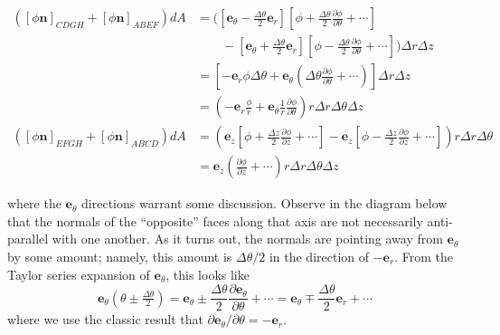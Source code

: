 \documentclass[a4paper]{article}
\begin{document}
\begin{align*}
	\!\left( \!\left[ \phi \pmb{n} \right]_{CDGH} + \!\left[ \phi \pmb{n} \right]_{ABEF} \right)dA & = \biggl( \!\left[ \pmb{e}_{\theta} - \frac{\Delta \theta}{2}\pmb{e}_{r} \right]\!\left[ \phi + \frac{\Delta \theta}{2}\frac{\partial \phi}{\partial \theta} + \cdots \right] \\
												       & \qquad - \!\left[ \pmb{e}_{\theta} + \frac{\Delta \theta}{2}\pmb{e}_{r} \right]\!\left[ \phi - \frac{\Delta \theta}{2}\frac{\partial \phi}{\partial \theta} + \cdots \right] \biggr)\Delta r \Delta z \\
												       & = \!\left[ -\pmb{e}_{r} \phi \Delta \theta + \pmb{e}_{\theta}\!\left( \Delta \theta \frac{\partial \phi}{\partial \theta} + \cdots \right) \right] \Delta r \Delta z \\ 
												       & = \!\left( -\pmb{e}_{r}\frac{\phi}{r} + \pmb{e}_{\theta}\frac{1}{r}\frac{\partial \phi}{\partial \theta} \right) r \Delta r \Delta \theta \Delta z \\
	\!\left( \!\left[ \phi \pmb{n} \right]_{EFGH} + \!\left[ \phi \pmb{n} \right]_{ABCD} \right)dA & = \!\left( \pmb{e}_{z}\!\left[ \phi + \frac{\Delta z}{2}\frac{\partial \phi}{\partial z} + \cdots \right] - \pmb{e}_{z}\!\left[ \phi - \frac{\Delta z}{2}\frac{\partial \phi}{\partial z} + \cdots \right] \right) r \Delta r \Delta \theta \\
												       & = \pmb{e}_{z}\!\left( \frac{\partial \phi}{\partial z} + \cdots \right)r \Delta r \Delta \theta \Delta z
\end{align*}

where the \( \pmb{e}_{\theta} \) directions warrant some discussion. Observe in the diagram below that the normals of the ``opposite'' faces along that axis are not necessarily anti-parallel with one another. As it turns out, the normals are pointing away from \( \pmb{e}_{\theta} \) by some amount; namely, this amount is \( \Delta \theta / 2 \) in the direction of \( -\pmb{e}_{r} \). From the Taylor series expansion of \( \pmb{e}_{\theta} \), this looks like
\[
	\pmb{e}_{\theta}\!\left( \theta \pm \tfrac{\Delta \theta}{2} \right) = \pmb{e}_{\theta} \pm \frac{\Delta \theta}{2}\frac{\partial \pmb{e}_{\theta}}{\partial \theta} + \cdots = \pmb{e}_{\theta} \mp \frac{\Delta \theta}{2}\pmb{e}_{r} + \cdots 
\]
where we use the classic result that \( \partial \pmb{e}_{\theta} / \partial \theta = -\pmb{e}_{r} \).
\end{document}
